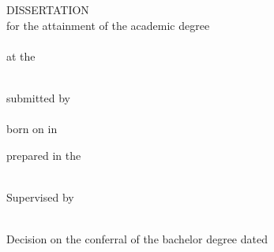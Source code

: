 
\begin{titlepage}
\begin{center}

\null
\vspace{\baselineskip}
{\huge {\bfseries \tTitle \par}}
\vspace{5\baselineskip}
{\large DISSERTATION} \\
\vspace{\baselineskip}
for the attainment of the academic degree \\
\vspace{\baselineskip}
{\large \tDegree} \\
\vspace{\baselineskip}
at the \\ \vspace{.2\baselineskip}{\large International Physics Study Program (IPSP) of the University of Leipzig} \\
\vspace{6\baselineskip}

\vfill

\noindent
submitted by \\
\vspace{.5\baselineskip}
{\bf \tAuthor} \\
\vspace{.25\baselineskip}
born on \tBirthday{} in \tNativeTown \\

\vspace{5\baselineskip}

\noindent
prepared in the \\
\tDepartment \\

\vspace{1.5\baselineskip}

\noindent
Supervised by \\
\vspace{.3\baselineskip}
\tSupervisor \\

\vspace{1.5\baselineskip}

\noindent
Decision on the conferral of the bachelor degree dated \tDefenceDate

\end{center}
\restoregeometry
\end{titlepage}

